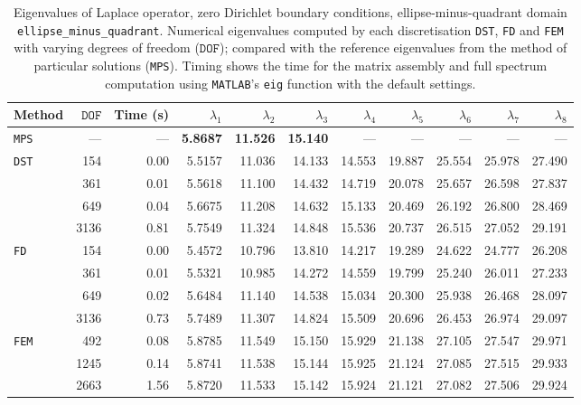 %

\begin{table}[htbp]
  \centering
  {\scriptsize
  \begin{tabular}{lrrrrrrrrrr}
    \toprule
    Method & $\mathtt{DOF}$ & Time (s) & $\lambda_{1}$ & $\lambda_{2}$ & $\lambda_{3}$ & $\lambda_{4}$ & $\lambda_{5}$ & $\lambda_{6}$ & $\lambda_{7}$ & $\lambda_{8}$ \\
    \midrule
    \texttt{MPS} & --- & --- & \textbf{5.8687} & \textbf{11.526} & \textbf{15.140} & --- & --- & --- & --- & --- \\
    \midrule
    \multirow{4}{*}{\texttt{DST}} & 154 & 0.00 & 5.5157 & 11.036 & 14.133 & 14.553 & 19.887 & 25.554 & 25.978 & 27.490 \\
     & 361 & 0.01 & 5.5618 & 11.100 & 14.432 & 14.719 & 20.078 & 25.657 & 26.598 & 27.837 \\
     & 649 & 0.04 & 5.6675 & 11.208 & 14.632 & 15.133 & 20.469 & 26.192 & 26.800 & 28.469 \\
     & 3136 & 0.81 & 5.7549 & 11.324 & 14.848 & 15.536 & 20.737 & 26.515 & 27.052 & 29.191 \\
    \midrule
    \multirow{4}{*}{\texttt{FD}} & 154 & 0.00 & 5.4572 & 10.796 & 13.810 & 14.217 & 19.289 & 24.622 & 24.777 & 26.208 \\
     & 361 & 0.01 & 5.5321 & 10.985 & 14.272 & 14.559 & 19.799 & 25.240 & 26.011 & 27.233 \\
     & 649 & 0.02 & 5.6484 & 11.140 & 14.538 & 15.034 & 20.300 & 25.938 & 26.468 & 28.097 \\
     & 3136 & 0.73 & 5.7489 & 11.307 & 14.824 & 15.509 & 20.696 & 26.453 & 26.974 & 29.097 \\
    \midrule
    \multirow{3}{*}{\texttt{FEM}} & 492 & 0.08 & 5.8785 & 11.549 & 15.150 & 15.929 & 21.138 & 27.105 & 27.547 & 29.971 \\
     & 1245 & 0.14 & 5.8741 & 11.538 & 15.144 & 15.925 & 21.124 & 27.085 & 27.515 & 29.933 \\
     & 2663 & 1.56 & 5.8720 & 11.533 & 15.142 & 15.924 & 21.121 & 27.082 & 27.506 & 29.924 \\
    \bottomrule
  \end{tabular}}
  \caption{Eigenvalues of Laplace operator, zero Dirichlet boundary conditions, ellipse-minus-quadrant domain \texttt{ellipse\_minus\_quadrant}. Numerical eigenvalues computed by each discretisation \texttt{DST}, \texttt{FD} and \texttt{FEM} with varying degrees of freedom ($\mathtt{DOF}$); compared with the reference eigenvalues from the method of particular solutions (\texttt{MPS}). Timing shows the time for the matrix assembly and full spectrum computation using \texttt{MATLAB}'s \lstinline{eig} function with the default settings.}
  \label{tab:eigenvalues_head_ellipse_minus_quadrant}
\end{table}
